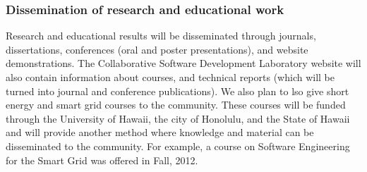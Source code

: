 \subsubsection*{Dissemination of research and educational work}

Research and educational results will be disseminated through journals, dissertations, conferences (oral and poster presentations), and website demonstrations.  The Collaborative Software Development Laboratory website will also contain information about courses, and technical reports (which will be turned into journal and conference publications).  We also plan to lso give short energy and smart grid courses to the community.  These courses will be funded through the University of Hawaii, the city of Honolulu, and the State of Hawaii and will provide another method where knowledge and material can be disseminated to the community.  For example, a course on Software Engineering for the Smart Grid was offered in Fall, 2012.

